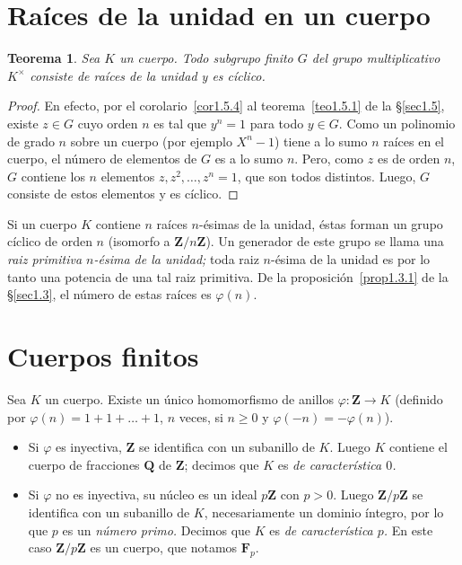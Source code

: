 \documentclass[10pt,oneside,bibtotoc,smallheadings,leqno,a5paper,DIV=12]{scrbook}
\newcommand{\QQ}{\mathbf{Q}}
\newcommand{\ZZ}{\mathbf{Z}}
\newcommand{\FF}{\mathbf{F}}
\newcommand{\QED}{}%
\renewcommand{\to}[1][]{\xrightarrow{#1}}
\numberwithin{equation}{section}
\theoremstyle{defi}
\theoremstyle{enonce}
\newtheorem{theorem}{Teorema}
\theoremstyle{rem}
\numberwithin{theorem}{section}
\numberwithin{proposition}{section}
\numberwithin{definition}{section}
\numberwithin{lemma}{section}
\numberwithin{corollary}{section}
\numberwithin{example}{section}
\numberwithin{footnote}{section}%
\begin{document}
\section{Ra\'ices de la unidad en un cuerpo}\label{sec1.6}

\begin{theorem}\label{teo1.6.1}
Sea $K$ un cuerpo. Todo subgrupo finito $G$ del grupo
multiplicativo $K^{\times}$ consiste de ra\'ices de la unidad y
es c\'iclico.
\end{theorem}

\begin{proof}
En efecto, por el corolario~\ref{cor1.5.4} al teorema~\ref{teo1.5.1}
de la \S\ref{sec1.5}, existe $z\in G$ cuyo orden $n$ es tal que $y^{n}=1$
para todo $y\in G$. Como un polinomio de grado $n$ sobre un cuerpo
(por ejemplo $X^{n}-1$) tiene a lo sumo $n$ ra\'ices en el
cuerpo, el n\'umero de elementos de $G$ es a lo sumo $n$.
Pero, como $z$ es de orden $n$, $G$ contiene los $n$ elementos
$z, z^{2},\dots,z^{n}=1$, que son todos distintos. Luego, $G$
consiste de estos elementos y es c\'iclico.%
\end{proof}

Si un cuerpo $K$ contiene $n$ ra\'ices $n$-\'esimas de la unidad,
\'estas forman un grupo c\'iclico de orden $n$ (isomorfo a
$\ZZ/n\ZZ$). Un generador de este grupo se llama una
{\em raiz primitiva $n$-\'esima de la unidad;} toda raiz $n$-\'esima
de la unidad es por lo tanto una potencia de una tal raiz primitiva.
De la proposici\'on~\ref{prop1.3.1} de la \S\ref{sec1.3}, el n\'umero de estas ra\'ices
es $\varphi(n)$.

\section{Cuerpos finitos}\label{sec1.7}

Sea $K$ un cuerpo. Existe un \'unico homomorfismo de anillos
$\varphi:\ZZ\to K$ (definido por $\varphi(n)=1+1+\dots+1$,
$n$ veces, si $n\geq 0$ y $\varphi(-n) = -\varphi(n)$).

\begin{itemize}
\item Si $\varphi$ es inyectiva, $\ZZ$ se identifica con un
subanillo de $K$. Luego $K$ contiene el cuerpo de fracciones
$\QQ$ de $\ZZ$; decimos que $K$ es {\em de caracter\'istica
$0$.}
\item Si $\varphi$ no es inyectiva, su n\'ucleo es un ideal
$p\ZZ$ con $p > 0$. Luego $\ZZ/p\ZZ$ se identifica con un
subanillo de $K$, necesariamente un dominio \'integro, por
lo que $p$ es un {\em n\'umero primo.} Decimos que $K$ es
{\em de caracter\'istica $p$.} En este caso $\ZZ/p\ZZ$ es un
cuerpo, que notamos $\FF_{p}$.
\end{itemize}
\end{document}
